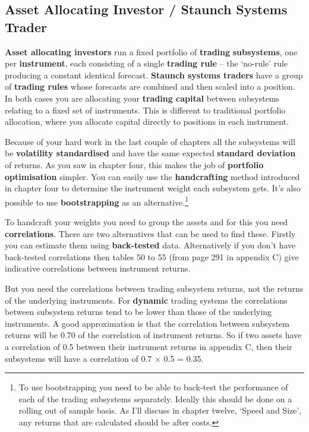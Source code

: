 \subsection*{Asset Allocating Investor / Staunch Systems Trader} \textbf{Asset allocating investors} run a fixed portfolio of \textbf{trading} \textbf{subsystems}, one per \textbf{instrument}, each consisting of a single \textbf{trading rule} -- the ‘no-rule' rule producing a constant identical forecast. \textbf{Staunch systems traders} have a group of \textbf{trading rules} whose forecasts are combined and then scaled into a position. In both cases you are allocating your \textbf{trading capital} between subsystems relating to a fixed set of instruments. This is different to traditional portfolio allocation, where you allocate capital directly to positions in each instrument.

Because of your hard work in the last couple of chapters all the subsystems will be \textbf{volatility standardised} and have the same expected \textbf{standard deviation} of returns. As you saw in chapter four, this makes the job of \textbf{portfolio optimisation} simpler. You can easily use the \textbf{handcrafting} method introduced in chapter four to determine the instrument weight each subsystem gets. It's also possible to use \textbf{bootstrapping} as an alternative.\footnote{To use bootstrapping you need to be able to back-test the performance of each of the trading subsystems separately. Ideally this should be done on a rolling out of sample basis. As I’ll discuss in chapter twelve, ‘Speed and Size’, any returns that are calculated should be after costs.}

To handcraft your weights you need to group the assets and for this you need \textbf{correlations}. There are two alternatives that can be used to find these. Firstly you can estimate them using \textbf{back-tested} data. Alternatively if you don't have back-tested correlations then tables 50 to 55 (from page 291 in appendix C) give indicative correlations between instrument returns.

But you need the correlations between trading subsystem returns, not the returns of the underlying instruments. For \textbf{dynamic} trading systems the correlations between subsystem returns tend to be lower than those of the underlying instruments. A good approximation is that the correlation between subsystem returns will be 0.70 of the correlation of instrument returns. So if two assets have a correlation of 0.5 between their instrument returns in appendix C, then their subsystems will have a correlation of 0.7 × 0.5 = 0.35.

